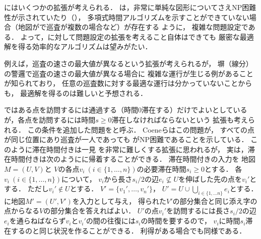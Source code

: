 






{\PPProfit}にはいくつかの拡張が考えられる．
%
{\PPProfit}は，非常に単純な図形についてさえNP困難性が示されていたり（\cite[Theorems 5 and 6]{coene2011charlemagne}），
多項式時間アルゴリズムを示すことができていない場合（地図が{\graphLine}で巡査が複数の場合など）が存在する
ように，
複雑な問題設定である．
よって，{\PPProfit}に対して問題設定の拡張を考えること自体はできても
厳密な最適解を得る効率的なアルゴリズムは望みがたい．

例えば，巡査の速さの最大値が異なるという拡張が考えられるが，
塀（線分）の警邏で巡査の速さの最大値が異なる場合に
複雑な運行が生じる例があることが知られており\cite[Theorem~1]{kawamura2015fence}，
任意の巡査数に対する最適な運行は分かっていないことからも，
最適解を得るのは難しいと予想される．

\newcommand{\patProbWithDuration}{{滞在時間付き{\PPProfit}}}
%
{\PPProfit}ではある点を訪問するには通過する（時間$0$滞在する）だけでよいとしているが，各点を訪問するには時間$s \geq 0$滞在しなければならないという
拡張も考えられる．
この条件を追加した問題を\defword{{\patProbWithDuration}}と呼ぶ．
Coeneら\cite{coene2011charlemagne}はこの問題が，
すべての点が同じ位置にあり巡査が一人であっても
{\PP}がNP困難であることを示している\cite[Theorem~3]{coene2011charlemagne}．
%
このように{\patProbWithDuration}は一見
{\PPProfit}を非常に難しくする拡張に思われるが，
実は，{\patProbWithDuration}は次のように{\PPProfit}に帰着することができる．
{\patProbWithDuration}の入力を
地図$M = (U, V)$と
$V$の各点$v_i\ (i \in \{ 1, \ldots, n \})$の必要滞在時間$s_i \geq 0$とする．
各$v_i\ (i \in \{ 1, \ldots, n \})$について，
$v_i$から長さ$s_i/2$の辺$e_i \not\subseteq U$を伸ばした先の点を$v_i'$とする．
ただし$v_i' \notin U$とする．
$V' = \{ v_1', \ldots, v_n' \}$，
$U' = U \cup \bigcup_{i \in \{ 1, \ldots n \}} e_i$とする．
{\PPProfit}に地図$M' = (U', V')$を入力として与え，
得られた$V'$の部分集合と同じ添え字の点からなる$V$の部分集合を答えればよい．
%
$U'$の点$v_i'$を訪問するには長さ$s_i/2$の辺$e_i$を通らねばならず$v_i$と$v_i'$の間の往復には$s_i$の時間を要するので，
$v_i$に時間$s_i$滞在するのと同じ状況を作ることができる．
利得がある場合でも同様である．

